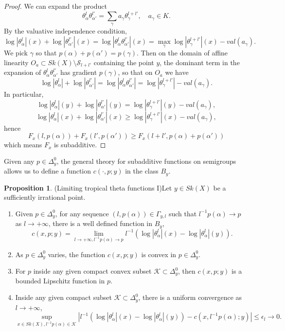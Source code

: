 \documentclass[a4paper]{article}
\theoremstyle{definition}
\newtheorem{prop}[thm]{Proposition}
\begin{document}
\begin{proof}
We can expand the product
\[
\theta_\alpha^l \theta_{\alpha'}^{l'}= \sum_\gamma a_\gamma \theta_\gamma^{l+l'},\quad a_\gamma\in K.
\]
By the valuative independence condition, 
\[
\log |\theta_\alpha^l |(x) + \log | \theta_{\alpha'}^{l'}|(x)= \log |\theta_\alpha^l \theta_{\alpha'}^{l'}|(x) =\max_\gamma \log  |\theta_\gamma^{l+l'}|(x)- val(a_\gamma).
\]
We pick $\gamma$ so that $p(\alpha)+ p(\alpha')= p(\gamma)$. Then  on the domain of affine linearity $O_a\subset Sk(X)\setminus \mathcal{S}_{l+l'}$ containing the point $y$, the dominant term in the  expansion of $\theta_\alpha^l \theta_{\alpha'}^{l'}$ has gradient $p(\gamma)$, so that on $O_a$ we have
\[
\log |\theta_\alpha^l |+  \log | \theta_{\alpha'}^{l'}|= \log |\theta_\alpha^l \theta_{\alpha'}^{l'}|= \log |\theta_\gamma^{l+l'}|- val(a_\gamma).
\]
In particular,
\[
\log |\theta_\alpha^l |(y)+  \log | \theta_{\alpha'}^{l'}|(y)= \log |\theta_\gamma^{l+l'}|(y)- val(a_\gamma),
\]
\[
\log |\theta_\alpha^l |(x)+  \log | \theta_{\alpha'}^{l'}|(x)\geq  \log |\theta_\gamma^{l+l'}|(x)- val(a_\gamma),
\]
hence
\[
F_x(l, p(\alpha))+ F_x(l', p(\alpha')) \geq F_x(l+l',   p(\alpha)+p(\alpha'))
\]
which means $F_x$ is subadditive.
\end{proof}
	
	
	
	
	
	
	
	
	
Given any $p\in \Delta_y^0$, 
the general theory for subadditive functions on semigroups allows us to define a function $c(\cdot, p;y)$ in the class $B_y$.




\begin{prop} (Limiting tropical theta functions I)\label{prop:limitingtropicalthetafromp} 	Let $y\in Sk(X)$ be a sufficiently irrational point.
\begin{enumerate}
	\item  Given $p\in \Delta_y^0$, for any sequence $(l, p(\alpha))\in \Gamma_{y,l}$ such that $l^{-1}p(\alpha)\to p$ as $l\to +\infty$, there is a well defined function in $B_y$,
	\[
	c(x,p;y)= \lim_{  l\to +\infty,   l^{-1}p(\alpha)\to p  }  l^{-1}(\log |\theta_\alpha^l|(x)- \log |\theta_\alpha^l|(y) ).
	\]
	
	
	\item As $p\in \Delta_y^0$ varies, the function $c(x,p;y)$ is convex in $p\in \Delta_y^0$.
	
	\item  For $p$ inside any given compact convex subset $\mathcal{K}\subset \Delta_y^0$, then $c(x,p;y)$ is a bounded Lipschitz function in $p$.
	
	
	\item  Inside any given compact subset $\mathcal{K}\subset \Delta_y^0$, there is a uniform convergence as $l\to +\infty$,
	\[
	\sup_{ x\in Sk(X) , l^{-1}p(\alpha) \in \mathcal{K} } |    l^{-1}(\log |\theta_\alpha^l|(x)- \log |\theta_\alpha^l|(y) )- c(x,  l^{-1}p(\alpha);y) | \leq \epsilon_l\to 0  .
	\]
\end{enumerate}
\end{prop}
	
\end{document}
